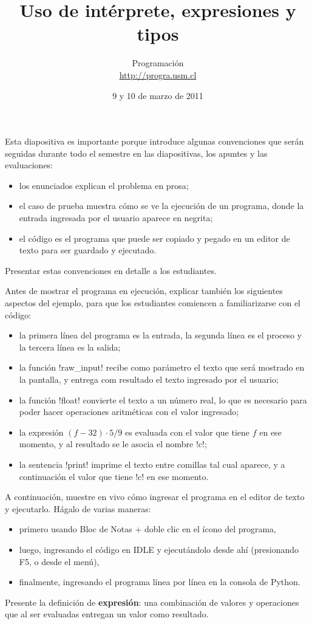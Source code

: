 \documentclass[10pt]{article}
\title{Uso de intérprete, expresiones y tipos}
\author{Programación \\ \url{http://progra.usm.cl}}
\date{9 y 10 de marzo de 2011}
\begin{document}
  \maketitle


  Esta diapositiva es importante
  porque introduce algunas convenciones
  que serán seguidas durante todo el semestre
  en las diapositivas, los apuntes y las evaluaciones:
  \begin{itemize}
    \item los enunciados explican el problema en prosa;
    \item el caso de prueba muestra cómo se ve la ejecución de un programa,
      donde la entrada ingresada por el usuario aparece en negrita;
    \item el código es el programa que puede ser copiado y pegado
      en un editor de texto para ser guardado y ejecutado.
  \end{itemize}
  Presentar estas convenciones en detalle a los estudiantes.

  Antes de mostrar el programa en ejecución,
  explicar también los siguientes aspectos del ejemplo,
  para que los estudiantes comiencen a familiarizarse con el código:
  \begin{itemize}
    \item la primera línea del programa es la entrada,
      la segunda línea es el proceso
      y la tercera línea es la salida;
    \item la función \li!raw_input! recibe como parámetro
      el texto que será mostrado en la pantalla,
      y entrega com resultado el texto ingresado por el usuario;
    \item la función \li!float! convierte el texto a un número real,
      lo que es necesario para poder hacer operaciones aritméticas
      con el valor ingresado;
    \item la expresión \((f - 32)\cdot 5/9\)
      es evaluada con el valor que tiene \(f\) en ese momento,
      y al resultado se le asocia el nombre \li!c!;
    \item la sentencia \li!print!
      imprime el texto entre comillas tal cual aparece,
      y a continuación el valor que tiene \li!c! en ese momento.
  \end{itemize}

  A continuación,
  muestre en vivo cómo ingresar el programa en el editor de texto y ejecutarlo.
  Hágalo de varias maneras:
  \begin{itemize}
    \item primero usando Bloc de Notas + doble clic en el ícono del programa,
    \item luego, ingresando el código en IDLE y ejecutándolo desde ahí
      (presionando F5, o desde el menú),
    \item finalmente,
      ingresando el programa línea por línea en la consola de Python.
  \end{itemize}

  Presente la definición de \textbf{expresión}:
  una combinación de valores y operaciones
  que al ser evaluadas entregan un valor como resultado.
\end{document}
